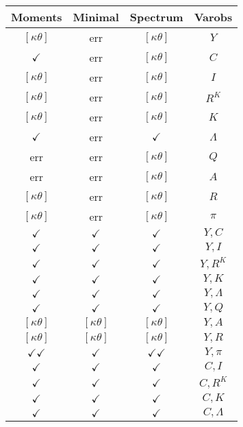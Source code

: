 \documentclass[a4paper,10pt]{article}
\begin{document}
\centering
\begin{longtable}{|c|c|c|c|}
\hline
Moments & Minimal & Spectrum & Varobs \\
\hline
$[\kappa \theta ]$ & err & $[\kappa \theta ]$ & ${Y}$ \\
\hline
$\checkmark$ & err & $[\kappa \theta ]$ & ${C}$ \\
\hline
$[\kappa \theta ]$ & err & $[\kappa \theta ]$ & ${I}$ \\
\hline
$[\kappa \theta ]$ & err & $[\kappa \theta ]$ & ${R^{K}}$ \\
\hline
$[\kappa \theta ]$ & err & $[\kappa \theta ]$ & ${K}$ \\
\hline
$\checkmark$ & err & $\checkmark$ & ${\Lambda}$ \\
\hline
err & err & $[\kappa \theta ]$ & ${Q}$ \\
\hline
err & err & $[\kappa \theta ]$ & ${A}$ \\
\hline
$[\kappa \theta ]$ & err & $[\kappa \theta ]$ & ${R}$ \\
\hline
$[\kappa \theta ]$ & err & $[\kappa \theta ]$ & ${\pi}$ \\
\hline
$\checkmark$ & $\checkmark$ & $\checkmark$ & ${Y},{C}$ \\
\hline
$\checkmark$ & $\checkmark$ & $\checkmark$ & ${Y},{I}$ \\
\hline
$\checkmark$ & $\checkmark$ & $\checkmark$ & ${Y},{R^{K}}$ \\
\hline
$\checkmark$ & $\checkmark$ & $\checkmark$ & ${Y},{K}$ \\
\hline
$\checkmark$ & $\checkmark$ & $\checkmark$ & ${Y},{\Lambda}$ \\
\hline
$\checkmark$ & $\checkmark$ & $\checkmark$ & ${Y},{Q}$ \\
\hline
$[\kappa \theta ]$ & $[\kappa \theta ]$ & $[\kappa \theta ]$ & ${Y},{A}$ \\
\hline
$[\kappa \theta ]$ & $[\kappa \theta ]$ & $[\kappa \theta ]$ & ${Y},{R}$ \\
\hline
$\checkmark\checkmark$ & $\checkmark$ & $\checkmark\checkmark$ & ${Y},{\pi}$ \\
\hline
$\checkmark$ & $\checkmark$ & $\checkmark$ & ${C},{I}$ \\
\hline
$\checkmark$ & $\checkmark$ & $\checkmark$ & ${C},{R^{K}}$ \\
\hline
$\checkmark$ & $\checkmark$ & $\checkmark$ & ${C},{K}$ \\
\hline
$\checkmark$ & $\checkmark$ & $\checkmark$ & ${C},{\Lambda}$ \\

\end{longtable}
\end{document}
